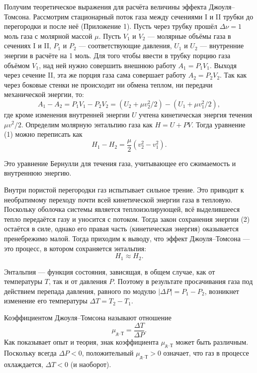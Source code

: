 \documentclass[a4paper]{article}
\begin{document}
	Получим теоретическое выражения для расчёта величины эффекта Джоуля--Томсона. Рассмотрим стационарный поток газа между сечениями I и II трубки до перегородки и после неё (Приложение 1). Пусть через трубку прошёл $\Delta\nu = 1$ моль газа с молярной массой $\mu$. Пусть $V_1$ и $V_2$ --- молярные объёмы газа в сечениях I и II, $P_1$ и $P_2$ --- соответствующие давления, $U_1$ и $U_2$ --- внутренние энергии в расчёте на 1 моль. Для того чтобы ввести в трубку порцию газа объёмом $V_1$, над ней нужно совершить внешнюю работу $A_1 = P_1V_1$. Выходя через сечение II, эта же порция газа сама совершает работу $A_2 = P_2V_2$. Так как через боковые стенки не происходит ни обмена теплом, ни передачи механической энергии, то:
	\begin{equation}
		A_1 - A_2 = P_1 V_1 - P_2 V_2 = (U_2 + \mu v_2^2/2) - (U_1 + \mu v_1^2/2),
	\end{equation}
	где кроме изменения внутренней энергии $U$ учтена кинетическая энергия течения $\mu v^2/2$. Определим молярную энтальпию газа как $H = U + PV$. Тогда уравнение (1) можно переписать как
	\begin{equation}
		H_1 - H_2 = \frac{\mu}{2}(v_2^2 - v_1^2).
	\end{equation}
	
	Это уравнение Бернулли для течения газа, учитывающее его сжимаемость и внутреннюю энергию.
	
	Внутри пористой перегородки газ испытывает сильное трение. Это приводит к необратимому переходу почти всей кинетической энергии газа в тепловую. Поскольку оболочка системы является теплоизолирующей, всё выделившееся тепло передаётся газу и уносится с потоком. Тогда закон сохранения энергии (2) остаётся в силе, однако его правая часть (кинетическая энергия) оказывается пренебрежимо малой. Тогда приходим к выводу, что эффект Джоуля--Томсона --- это процесс, в котором сохраняется энтальпия:
	\begin{equation}
		H_1 \approx H_2.
	\end{equation}
	
	Энтальпия --- функция состояния, зависящая, в общем случае, как от температуры $T$, так и от давления $P$. Поэтому в результате просачивания газа под действием перепада давления, равного по модулю $|\Delta P| = P_1 - P_2$, возникнет изменение его температуры $\Delta T = T_2 - T_1$. 
	
	Коэффициентом Джоуля--Томсона называют отношение
	\begin{equation}
		\mu_{\text{д--Т}} = \frac{\Delta T}{\Delta P}.
	\end{equation}
	Как показывает опыт и теория, знак коэффициента $\mu_{\text{д--Т}}$ может быть различным. Поскольку всегда $\Delta P < 0$, положительный $\mu_{\text{д--Т}} > 0$ означает, что газ в процессе охлаждается, $\Delta T < 0$ (и наоборот).
	
\end{document}
